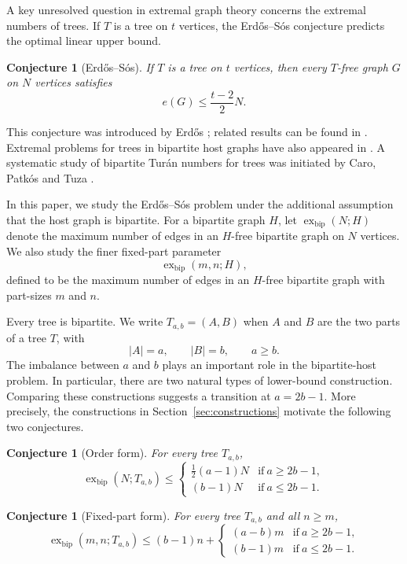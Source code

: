 \documentclass[12pt]{article}
\newtheorem{conjecture}[theorem]{Conjecture}
\theoremstyle{definition}
\theoremstyle{remark}
\newcommand{\exbip}{\operatorname{ex}_{\mathrm{bip}}}
\begin{document}
A key unresolved question in extremal graph theory concerns the extremal numbers of trees. If $T$ is a tree on $t$ vertices, the Erd\H{o}s--S\'os conjecture predicts the optimal linear upper bound.

\begin{conjecture}[Erd\H{o}s--S\'os]
\label{conj:erdos-sos}
If $T$ is a tree on $t$ vertices, then every $T$-free graph $G$ on $N$ vertices satisfies
\[
e(G)\leq \frac{t-2}{2}N.
\]
\end{conjecture}

This conjecture was introduced by Erd\H{o}s \cite{erdos1964extremal}; related results can be found in
\cite{sidorenko2018keyrings,goerlich2016,besomi2021}.
Extremal problems for trees in bipartite host graphs have also appeared in
\cite{erdos1964extremal,kopylov1977,yuan2017,li2021,chen2023,yuan2024}.
A systematic study of bipartite Tur\'an numbers for trees was initiated by Caro, Patk\'os and Tuza \cite{caro2025}.

In this paper, we study the Erd\H{o}s--S\'os problem under the additional assumption that the host graph is bipartite. For a bipartite graph $H$, let $\exbip(N;H)$ denote the maximum number of edges in an $H$-free bipartite graph on $N$ vertices. We also study the finer fixed-part parameter
\[
\exbip(m,n;H),
\]
defined to be the maximum number of edges in an $H$-free bipartite graph with part-sizes $m$ and $n$.

Every tree is bipartite. We write $T_{a,b}=(A,B)$ when $A$ and $B$ are the two parts of a tree $T$, with
\[
|A|=a,\qquad |B|=b,\qquad a\geq b.
\]
The imbalance between $a$ and $b$ plays an important role in the bipartite-host problem. In particular, there are two natural types of lower-bound construction. Comparing these constructions suggests a transition at $a=2b-1$. More precisely, the constructions in Section~\ref{sec:constructions} motivate the following two conjectures.

\begin{conjecture}[Order form]
\label{conj:order}
For every tree $T_{a,b}$,
\[
    \exbip(N;T_{a,b})\le\begin{cases}
        \frac12(a-1)N& \text{if}\ a\geq2b-1,\\
        (b-1)N& \text{if}\ a\leq2b-1.
    \end{cases}
\]
\end{conjecture}

\begin{conjecture}[Fixed-part form]
\label{conj:fixed-parts}
For every tree $T_{a,b}$ and all $n\geq m$,
\[
    \exbip(m,n;T_{a,b})\le(b-1)n+\begin{cases}
    (a-b)m&\text{if}\ a\geq2b-1,\\
    (b-1)m&\text{if}\ a\leq2b-1.
    \end{cases}
\]
\end{conjecture}
\end{document}
